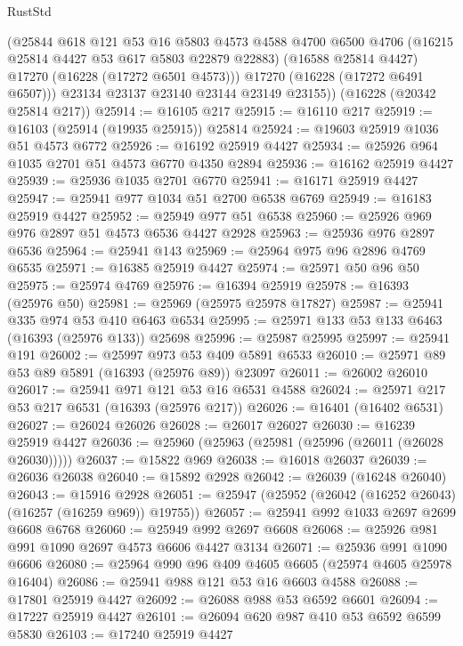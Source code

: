 \begin{lexlean}{RustStd}
\begin{coremodule}
          (@25844
            @618
            @121
            @53
            @16
            @5803
            @4573
            @4588
            @4700
            @6500
            @4706
            (@16215 @25814 @4427 @53 @617 @5803 @22879 @22883)
            (@16588 @25814 @4427)
            @17270
            (@16228 (@17272 @6501 @4573)))
          @17270
          (@16228 (@17272 @6491 @6507)))
        @23134
        @23137
        @23140
        @23144
        @23149
        @23155))
    (@16228 (@20342 @25814 @217))
@25914 := @16105 @217
@25915 := @16110 @217
@25919 := @16103 (@25914 (@19935 @25915)) @25814
@25924 := @19603 @25919 @1036 @51 @4573 @6772
@25926 := @16192 @25919 @4427
@25934 := @25926 @964 @1035 @2701 @51 @4573 @6770 @4350 @2894
@25936 := @16162 @25919 @4427
@25939 := @25936 @1035 @2701 @6770
@25941 := @16171 @25919 @4427
@25947 := @25941 @977 @1034 @51 @2700 @6538 @6769
@25949 := @16183 @25919 @4427
@25952 := @25949 @977 @51 @6538
@25960 := @25926 @969 @976 @2897 @51 @4573 @6536 @4427 @2928
@25963 := @25936 @976 @2897 @6536
@25964 := @25941 @143
@25969 := @25964 @975 @96 @2896 @4769 @6535
@25971 := @16385 @25919 @4427
@25974 := @25971 @50 @96 @50
@25975 := @25974 @4769
@25976 := @16394 @25919
@25978 := @16393 (@25976 @50)
@25981 := @25969 (@25975 @25978 @17827)
@25987 := @25941 @335 @974 @53 @410 @6463 @6534
@25995 := @25971 @133 @53 @133 @6463 (@16393 (@25976 @133)) @25698
@25996 := @25987 @25995
@25997 := @25941 @191
@26002 := @25997 @973 @53 @409 @5891 @6533
@26010 := @25971 @89 @53 @89 @5891 (@16393 (@25976 @89)) @23097
@26011 := @26002 @26010
@26017 := @25941 @971 @121 @53 @16 @6531 @4588
@26024 := @25971 @217 @53 @217 @6531 (@16393 (@25976 @217))
@26026 := @16401 (@16402 @6531)
@26027 := @26024 @26026
@26028 := @26017 @26027
@26030 := @16239 @25919 @4427
@26036 := @25960 (@25963 (@25981 (@25996 (@26011 (@26028 @26030)))))
@26037 := @15822 @969
@26038 := @16018 @26037
@26039 := @26036 @26038
@26040 := @15892 @2928
@26042 := @26039 (@16248 @26040)
@26043 := @15916 @2928
@26051 := @25947 (@25952 (@26042 (@16252 @26043) (@16257 (@16259 @969)) @19755))
@26057 := @25941 @992 @1033 @2697 @2699 @6608 @6768
@26060 := @25949 @992 @2697 @6608
@26068 := @25926 @981 @991 @1090 @2697 @4573 @6606 @4427 @3134
@26071 := @25936 @991 @1090 @6606
@26080 := @25964 @990 @96 @409 @4605 @6605 (@25974 @4605 @25978 @16404)
@26086 := @25941 @988 @121 @53 @16 @6603 @4588
@26088 := @17801 @25919 @4427
@26092 := @26088 @988 @53 @6592 @6601
@26094 := @17227 @25919 @4427
@26101 := @26094 @620 @987 @410 @53 @6592 @6599 @5830
@26103 := @17240 @25919 @4427

\end{coremodule}
\end{lexlean}
